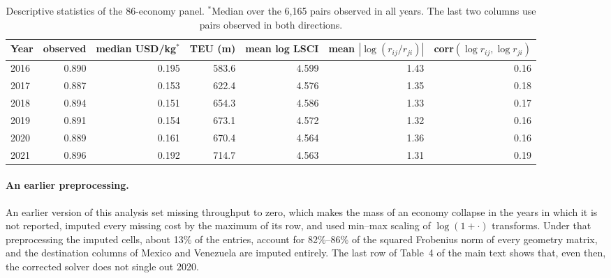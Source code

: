 \documentclass[12pt]{article}
\begin{document}
\begin{table}[h]
\caption{Descriptive statistics of the 86-economy panel. $^\ast$Median over the 6{,}165 pairs observed in all years. The last two columns use pairs observed in both directions.}\label{tab:desc}
\centering\footnotesize
\begin{tabular}{lrrrrrr}
\toprule
Year & observed & median USD/kg$^\ast$ & TEU (m) & mean log LSCI & mean $|\log(r_{ij}/r_{ji})|$ & corr$(\log r_{ij},\log r_{ji})$\\
\midrule
2016 & 0.890 & 0.195 & 583.6 & 4.599 & 1.43 & 0.16\\
2017 & 0.887 & 0.153 & 622.4 & 4.576 & 1.35 & 0.18\\
2018 & 0.894 & 0.151 & 654.3 & 4.586 & 1.33 & 0.17\\
2019 & 0.891 & 0.154 & 673.1 & 4.572 & 1.32 & 0.16\\
2020 & 0.889 & 0.161 & 670.4 & 4.564 & 1.36 & 0.16\\
2021 & 0.896 & 0.192 & 714.7 & 4.563 & 1.31 & 0.19\\
\bottomrule
\end{tabular}

\end{table}

\paragraph{An earlier preprocessing.} An earlier version of this analysis set missing throughput to zero, which makes the mass of an economy collapse in the years in which it is not reported, imputed every missing cost by the maximum of its row, and used min--max scaling of $\log(1+\cdot)$ transforms. Under that preprocessing the imputed cells, about 13\% of the entries, account for 82\%--86\% of the squared Frobenius norm of every geometry matrix, and the destination columns of Mexico and Venezuela are imputed entirely. The last row of Table~4 of the main text shows that, even then, the corrected solver does not single out 2020.
\end{document}
